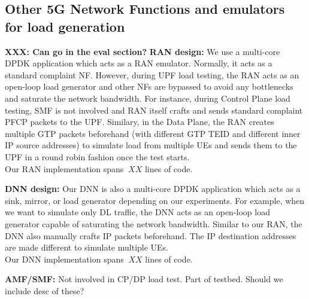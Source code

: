 \subsection{Other 5G Network Functions and emulators for load generation }
{\textbf{XXX: Can go in the eval section?}}
\noindent \textbf{RAN design:} 
We use a multi-core DPDK application which acts as a RAN emulator. Normally, it acts as a standard complaint NF. However, during UPF load testing, the RAN acts as an open-loop load generator and other NFs are bypassed to avoid any bottlenecks and saturate the network bandwidth. For instance, during Control Plane load testing, SMF is not involved and RAN itself crafts and sends standard complaint PFCP packets to the UPF. Similary, in the Data Plane, the RAN creates multiple GTP packets beforehand (with different GTP TEID and different inner IP source addresses) to simulate load from multiple UEs and sends them to the UPF in a round robin fashion once the test starts.\\
Our RAN implementation spans $~XX$ lines of code.

\noindent \textbf{DNN design:}
Our DNN is also a multi-core DPDK application which acts as a sink, mirror, or load generator depending on our experiments. For example, when we want to simulate only DL traffic, the DNN acts as an open-loop load generator capable of saturating the network bandwidth. Similar to our RAN, the DNN also manually crafts IP packets beforehand. The IP destination addresses are made different to simulate multiple UEs.\\
Our DNN implementation spans $~XX$ lines of code.

\noindent \textbf{AMF/SMF:}
Not involved in CP/DP load test. Part of testbed. Should we include desc of these?
